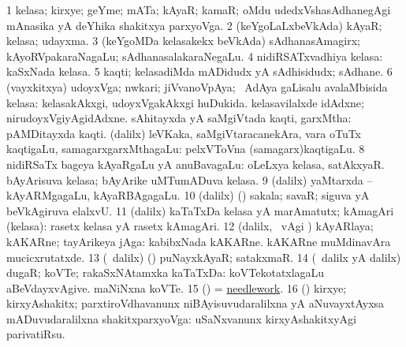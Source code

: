 \bentry
{} 
\gl{\nA}
\expl{}
\bmng
\bnum
\num{1} kelasa; kirxye; geYme; mATa; kAyaR; kamaR; oMdu udedxVshasAdhanegAgi mAnasika yA deYhika shakitxya parxyoVga. 
\num{2} (keYgoLaLxbeVkAda) kAyaR; kelasa; udayxma. 
\num{3} (keYgoMDa kelasakekx beVkAda) sAdhanasAmagirx; kAyoRVpakaraNagaLu; sAdhanasalakaraNegaLu. 
\num{4} nidiRSATxvadhiya kelasa:  kaSxNada kelasa. 
\num{5} kaqti; kelasadiMda mADidudx yA sAdhisidudx; sAdhane. 
\num{6} (vayxkitxya) udoyxVga; nwkari; jiVvanoVpAya; \kanmu\ AdAya gaLisalu avalaMbisida kelasa:  kelasakAkxgi, udoyxVgakAkxgi huDukida.  kelasavilalxde idAdxne; nirudoyxVgiyAgidAdxne. 
\banum
{} sAhitayxda yA saMgiVtada kaqti, garxMtha:  pAMDitayxda kaqti. 
 (\bava dalilx) leVKaka, saMgiVtaracanekAra, \mo vara oTuTx kaqtigaLu, samagarxgarxMthagaLu:  pelxVToVna (samagarx)kaqtigaLu. 
\eanum
\numie
\num{8} nidiRSaTx bageya kAyaRgaLu yA anuBavagaLu:  oLeLxya kelasa, satAkxyaR.  bAyArisuva kelasa; bAyArike uMTumADuva kelasa. 
\num{9} (\bava dalilx) yaMtarxda -- kAyARMgagaLu, kAyaRBAgagaLu. 
\num{10} (\bava dalilx) (\AmA) sakala; savaR; siguva yA beVkAgiruva elalxvU. 
\num{11} (\bava dalilx) kaTaTxDa kelasa yA marAmatutx; kAmagAri (kelasa):  rasetx kelasa yA rasetx kAmagAri. 
\num{12} (\bava dalilx, \sA\ \Eva vAgi \parx) kAyARlaya; kAKARne; tayArikeya jAga:  kabibxNada kAKARne.  kAKARne muMdinavAra mucicxrutatxde. 
\num{13} (\sA\ \bava dalilx) (\deVva) puNayxkAyaR; satakxmaR. 
\num{14} (\sA\ \bava dalilx yA \saMpa dalilx) dugaR; koVTe; rakaSxNAtamxka kaTaTxDa:  koVTekotatxlagaLu aBeVdayxvAgive.  maNiNxna koVTe. 
\num{15} (\pArxparx) = \hyperref{kandict_n.pdf}{N}{needlework}{needlework}. 
\num{16} (\Bwvi) kirxye; kirxyAshakitx; parxtiroVdhavanunx niBAyisuvudaralilxna yA aNuvayxtAyxsa mADuvudaralilxna shakitxparxyoVga:  uSaNxvanunx kirxyAshakitxyAgi parivatiRsu. 
\enum
\emng

